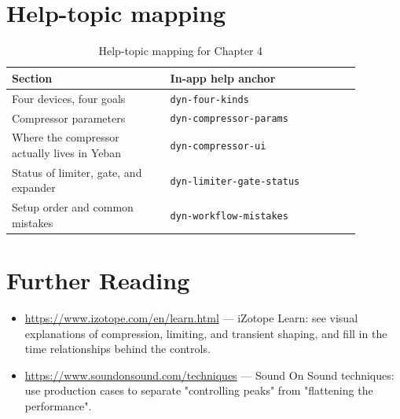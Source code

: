 \section{Help-topic mapping}

\begin{table}[htbp]
\centering
\small
\begin{tabular}{@{}p{0.40\linewidth}p{0.48\linewidth}@{}}
\hline
Section & In-app help anchor \\
\hline
Four devices, four goals & \texttt{dyn-four-kinds} \\
Compressor parameters & \texttt{dyn-compressor-params} \\
Where the compressor actually lives in Yeban & \texttt{dyn-compressor-ui} \\
Status of limiter, gate, and expander & \texttt{dyn-limiter-gate-status} \\
Setup order and common mistakes & \texttt{dyn-workflow-mistakes} \\
\hline
\end{tabular}
\caption{Help-topic mapping for Chapter 4}
\end{table}

\section*{Further Reading}
\begin{itemize}[leftmargin=1.5em]
\item \url{https://www.izotope.com/en/learn.html} — iZotope Learn: see visual explanations of compression, limiting, and transient shaping, and fill in the time relationships behind the controls.
\item \url{https://www.soundonsound.com/techniques} — Sound On Sound techniques: use production cases to separate "controlling peaks" from "flattening the performance".
\end{itemize}
